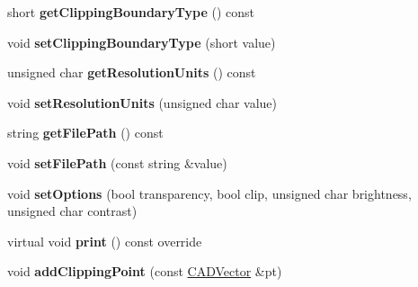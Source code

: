 \begin{DoxyCompactItemize}
\item 
short {\bfseries get\+Clipping\+Boundary\+Type} () const \hypertarget{class_c_a_d_image_a577f2d1a9f5d65ce58b4967af3fbae69}{}\label{class_c_a_d_image_a577f2d1a9f5d65ce58b4967af3fbae69}

\item 
void {\bfseries set\+Clipping\+Boundary\+Type} (short value)\hypertarget{class_c_a_d_image_aa4cc4146fa6ca1bbdc32a777ffa061f1}{}\label{class_c_a_d_image_aa4cc4146fa6ca1bbdc32a777ffa061f1}

\item 
unsigned char {\bfseries get\+Resolution\+Units} () const \hypertarget{class_c_a_d_image_aac9e62121508ae4b1e9c68bd07218c49}{}\label{class_c_a_d_image_aac9e62121508ae4b1e9c68bd07218c49}

\item 
void {\bfseries set\+Resolution\+Units} (unsigned char value)\hypertarget{class_c_a_d_image_a42f06a2f48b78b741607ee6defa22642}{}\label{class_c_a_d_image_a42f06a2f48b78b741607ee6defa22642}

\item 
string {\bfseries get\+File\+Path} () const \hypertarget{class_c_a_d_image_aaac79b3c18e301c5d1ca24323bab4766}{}\label{class_c_a_d_image_aaac79b3c18e301c5d1ca24323bab4766}

\item 
void {\bfseries set\+File\+Path} (const string \&value)\hypertarget{class_c_a_d_image_af3a88e40c65175c089c1d5f2dee364c2}{}\label{class_c_a_d_image_af3a88e40c65175c089c1d5f2dee364c2}

\item 
void {\bfseries set\+Options} (bool transparency, bool clip, unsigned char brightness, unsigned char contrast)\hypertarget{class_c_a_d_image_af01bb204aaab3e84bd13e6be0f4aa602}{}\label{class_c_a_d_image_af01bb204aaab3e84bd13e6be0f4aa602}

\item 
virtual void {\bfseries print} () const  override\hypertarget{class_c_a_d_image_af05c090911108ad91b8edda1eeb0ce8f}{}\label{class_c_a_d_image_af05c090911108ad91b8edda1eeb0ce8f}

\item 
void {\bfseries add\+Clipping\+Point} (const \hyperlink{class_c_a_d_vector}{C\+A\+D\+Vector} \&pt)\hypertarget{class_c_a_d_image_a84331cc0502fde358bf4ccfc4725e9b1}{}\label{class_c_a_d_image_a84331cc0502fde358bf4ccfc4725e9b1}

\end{DoxyCompactItemize}
